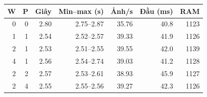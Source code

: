 \begin{tabular}{rrrrrrr}
\toprule
W & P & Giây & Min--max (s) & Ảnh/s & Đầu (ms) & RAM \\
\midrule
0 & 0 & 2.80 & 2.75--2.87 & 35.76 & 40.8 & 1123 \\
1 & 1 & 2.54 & 2.52--2.57 & 39.33 & 41.9 & 1126 \\
2 & 1 & 2.53 & 2.51--2.55 & 39.55 & 42.0 & 1139 \\
4 & 1 & 2.56 & 2.54--2.74 & 39.03 & 41.2 & 1128 \\
2 & 2 & 2.57 & 2.53--2.61 & 38.93 & 45.9 & 1127 \\
2 & 4 & 2.55 & 2.55--2.56 & 39.27 & 42.3 & 1126 \\
\bottomrule
\end{tabular}
